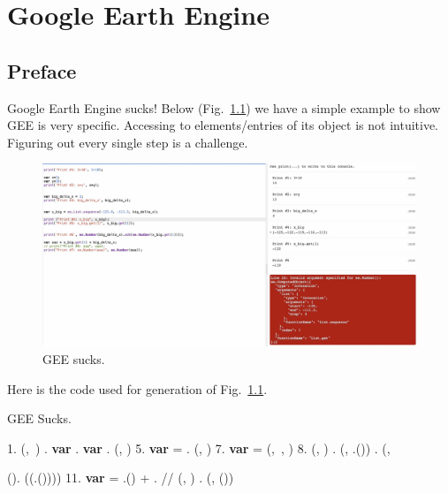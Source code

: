 \chapter{Google Earth Engine}
\label{chap:Google Earth Engine}

\section{Preface}
Google Earth Engine sucks! 
Below (Fig.~\ref{fig:GEESucks}) 
we have a simple example to show GEE is very specific.
Accessing to elements/entries of its object is not
intuitive. Figuring out every single step is a 
challenge.
\begin{figure}
  \centering
  \includegraphics[width=1\textwidth]{figures/GEE_Sucks}
  \caption{GEE sucks.}
  \label{fig:GEESucks}
\end{figure}
\noindent Here is the code used for generation of Fig.~\ref{fig:GEESucks}.
\begin{tcolorbox}
  \begin{algorithm}[H]
  \label{alg:GEE_Sucks}
   \caption{GEE Sucks.}
\SetAlgoLined
1. (,~) . \textbf{var}   . \textbf{var}  . (, 
) \;
\vspace{.1in}
5. \textbf{var}  =  . (, ) \;
\vspace{.1in}
7. \textbf{var}  = (,~, ) \;
\vspace{.1in}
8.  (, ) . (, .()) . (,

().
((.()))) \;
\vspace{.1in}
11. \textbf{var}  
     = .() +
      . // (, ) . (, ()) \;
\end{algorithm}
\end{tcolorbox}

